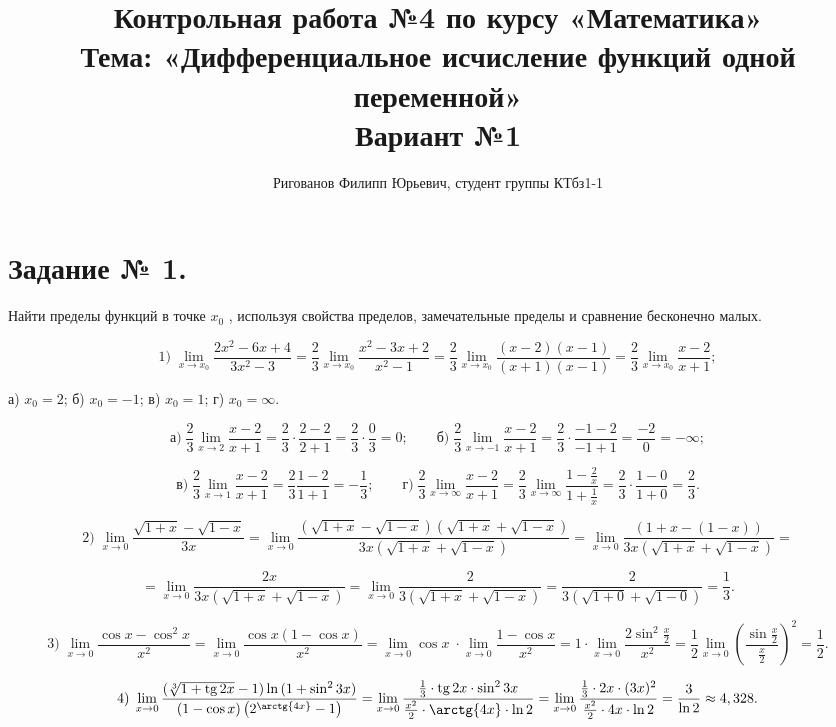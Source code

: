 \documentclass[fleqn]{article}
\title{Контрольная работа №4 по курсу «Математика»\\
Тема: «Дифференциальное исчисление функций одной переменной»\\
Вариант №1}
\author{Ригованов Филипп Юрьевич, студент группы КТбз1-1}
\newcommand{\tg}{\mathop{\rm tg}\nolimits}
\begin{document}
\date{}
\maketitle
\section*{Задание № 1.}
Найти пределы функций в точке $x_0$ , используя свойства пределов, замечательные
пределы и сравнение бесконечно малых.

$$1)\; \lim_{x\to x_0}\frac{2x^2-6x+4}{3x^2-3}=\frac{2}{3}\lim_{x\to x_0}\frac{x^2-3x+2}{x^2-1}=\frac{2}{3}\lim_{x\to x_0}\frac{(x-2)(x-1)}{(x+1)(x-1)}=\frac{2}{3}\lim_{x\to x_0}\frac{x-2}{x+1};$$

а) $x_0=2$; б) $x_0=-1$; в) $x_0=1$; г) $x_0=\infty$.

$$\textit{а})\;\frac{2}{3}\lim_{x\to2}\frac{x-2}{x+1}=\frac{2}{3}\cdot\frac{2-2}{2+1}=\frac{2}{3}\cdot\frac{0}{3}=0;\qquad\textit{б})\;\frac{2}{3}\lim_{x\to{-1}}\frac{x-2}{x+1}=\frac{2}{3}\cdot\frac{-1-2}{-1+1}=\frac{-2}{0}=-\infty;$$

$$\textit{в})\;\frac{2}{3}\lim_{x\to1}\frac{x-2}{x+1}=\frac{2}{3}\frac{1-2}{1+1}=-\frac{1}{3};\qquad\textit{г})\;\frac{2}{3}\lim_{x\to\infty}\frac{x-2}{x+1}=\frac{2}{3}\lim_{x\to\infty}\frac{1-\frac{2}{x}}{1+\frac{1}{x}}=\frac{2}{3}\cdot\frac{1-0}{1+0}=\frac{2}{3}.$$

$$2)\; \lim_{x\to0}\frac{\sqrt{1+x}-\sqrt{1-x}}{3x}=\lim_{x\to0}\frac{(\sqrt{1+x}-\sqrt{1-x})(\sqrt{1+x}+\sqrt{1-x})}{3x(\sqrt{1+x}+\sqrt{1-x})}=\lim_{x\to0}\frac{(1+x-(1-x))}{3x(\sqrt{1+x}+\sqrt{1-x})}=$$

$$=\lim_{x\to0}\frac{2x}{3x(\sqrt{1+x}+\sqrt{1-x})}=\lim_{x\to0}\frac{2}{3(\sqrt{1+x}+\sqrt{1-x})}=\frac{2}{3(\sqrt{1+0}+\sqrt{1-0})}=\frac{1}{3}.$$

$$3)\; \lim_{x\to0}\frac{\cos{x}-\cos^2{x}}{x^2}=\lim_{x\to0}\frac{\cos{x}(1-\cos{x})}{x^2}=\lim_{x\to0}\cos{x}\;\cdot\lim_{x\to0}\frac{1-\cos{x}}{x^2}=1\cdot\lim_{x\to0}\frac{2\sin^2{\frac{x}{2}}}{x^2}=\frac{1}{2}\lim_{x\to0}\left(\frac{\sin{\frac{x}{2}}}{\frac{x}{2}}\right)^2=\frac{1}{2}.$$

$$4)\; \lim_{x\to0}\frac{\left(\sqrt[3]{1+\tg{2x}}-1\right)\ln{(1+\sin^2{3x})}}{(1-\cos{x})\left(2^{\arctg{4x}}-1\right)}=\lim_{x\to0}\frac{\frac{1}{3}\cdot\tg{2x}\cdot\sin^2{3x}}{\frac{x^2}{2}\cdot\arctg{4x}\cdot\ln2}=\lim_{x\to0}\frac{\frac{1}{3}\cdot2x\cdot(3x)^2}{\frac{x^2}{2}\cdot4x\cdot\ln2}=\frac{3}{\ln2}\approx4,328.$$
\end{document}
